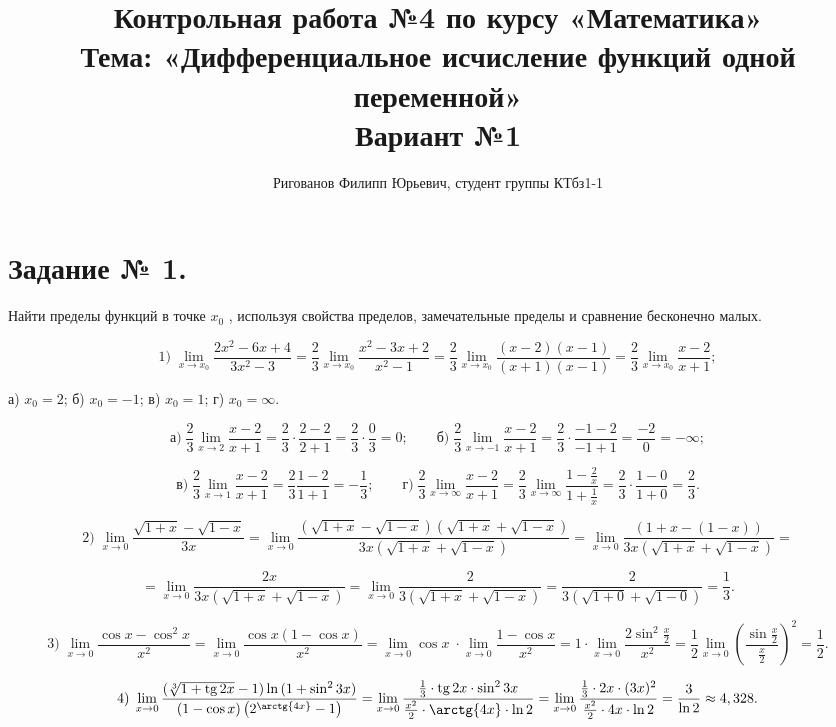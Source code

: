 \documentclass[fleqn]{article}
\title{Контрольная работа №4 по курсу «Математика»\\
Тема: «Дифференциальное исчисление функций одной переменной»\\
Вариант №1}
\author{Ригованов Филипп Юрьевич, студент группы КТбз1-1}
\newcommand{\tg}{\mathop{\rm tg}\nolimits}
\begin{document}
\date{}
\maketitle
\section*{Задание № 1.}
Найти пределы функций в точке $x_0$ , используя свойства пределов, замечательные
пределы и сравнение бесконечно малых.

$$1)\; \lim_{x\to x_0}\frac{2x^2-6x+4}{3x^2-3}=\frac{2}{3}\lim_{x\to x_0}\frac{x^2-3x+2}{x^2-1}=\frac{2}{3}\lim_{x\to x_0}\frac{(x-2)(x-1)}{(x+1)(x-1)}=\frac{2}{3}\lim_{x\to x_0}\frac{x-2}{x+1};$$

а) $x_0=2$; б) $x_0=-1$; в) $x_0=1$; г) $x_0=\infty$.

$$\textit{а})\;\frac{2}{3}\lim_{x\to2}\frac{x-2}{x+1}=\frac{2}{3}\cdot\frac{2-2}{2+1}=\frac{2}{3}\cdot\frac{0}{3}=0;\qquad\textit{б})\;\frac{2}{3}\lim_{x\to{-1}}\frac{x-2}{x+1}=\frac{2}{3}\cdot\frac{-1-2}{-1+1}=\frac{-2}{0}=-\infty;$$

$$\textit{в})\;\frac{2}{3}\lim_{x\to1}\frac{x-2}{x+1}=\frac{2}{3}\frac{1-2}{1+1}=-\frac{1}{3};\qquad\textit{г})\;\frac{2}{3}\lim_{x\to\infty}\frac{x-2}{x+1}=\frac{2}{3}\lim_{x\to\infty}\frac{1-\frac{2}{x}}{1+\frac{1}{x}}=\frac{2}{3}\cdot\frac{1-0}{1+0}=\frac{2}{3}.$$

$$2)\; \lim_{x\to0}\frac{\sqrt{1+x}-\sqrt{1-x}}{3x}=\lim_{x\to0}\frac{(\sqrt{1+x}-\sqrt{1-x})(\sqrt{1+x}+\sqrt{1-x})}{3x(\sqrt{1+x}+\sqrt{1-x})}=\lim_{x\to0}\frac{(1+x-(1-x))}{3x(\sqrt{1+x}+\sqrt{1-x})}=$$

$$=\lim_{x\to0}\frac{2x}{3x(\sqrt{1+x}+\sqrt{1-x})}=\lim_{x\to0}\frac{2}{3(\sqrt{1+x}+\sqrt{1-x})}=\frac{2}{3(\sqrt{1+0}+\sqrt{1-0})}=\frac{1}{3}.$$

$$3)\; \lim_{x\to0}\frac{\cos{x}-\cos^2{x}}{x^2}=\lim_{x\to0}\frac{\cos{x}(1-\cos{x})}{x^2}=\lim_{x\to0}\cos{x}\;\cdot\lim_{x\to0}\frac{1-\cos{x}}{x^2}=1\cdot\lim_{x\to0}\frac{2\sin^2{\frac{x}{2}}}{x^2}=\frac{1}{2}\lim_{x\to0}\left(\frac{\sin{\frac{x}{2}}}{\frac{x}{2}}\right)^2=\frac{1}{2}.$$

$$4)\; \lim_{x\to0}\frac{\left(\sqrt[3]{1+\tg{2x}}-1\right)\ln{(1+\sin^2{3x})}}{(1-\cos{x})\left(2^{\arctg{4x}}-1\right)}=\lim_{x\to0}\frac{\frac{1}{3}\cdot\tg{2x}\cdot\sin^2{3x}}{\frac{x^2}{2}\cdot\arctg{4x}\cdot\ln2}=\lim_{x\to0}\frac{\frac{1}{3}\cdot2x\cdot(3x)^2}{\frac{x^2}{2}\cdot4x\cdot\ln2}=\frac{3}{\ln2}\approx4,328.$$
\end{document}
